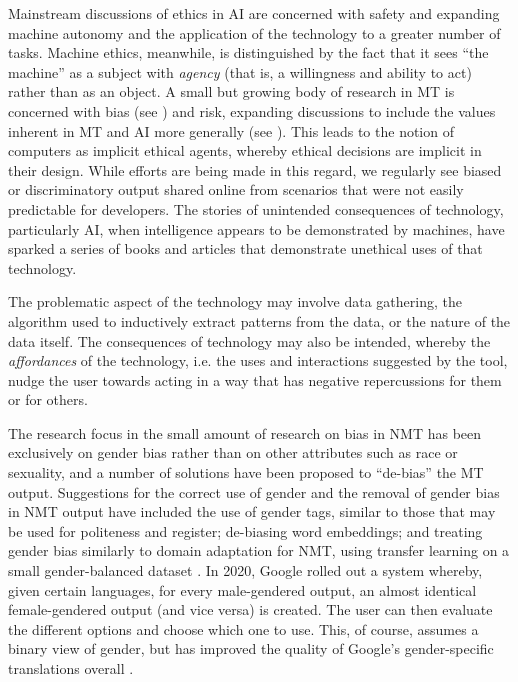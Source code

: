 \documentclass[output=paper]{langscibook}
\begin{document}
Mainstream discussions of ethics in AI are concerned with safety and expanding machine autonomy and the application of the technology to a greater number of tasks. Machine ethics, meanwhile, is distinguished by the fact that it sees “the machine” as a subject with \textit{agency} (that is, a willingness and ability to act) rather than as an object. A small but growing body of research in MT is concerned with bias (see ) and risk, expanding discussions to include the values inherent in MT and AI more generally (see ). This leads to the notion of computers as implicit ethical agents, whereby ethical decisions are implicit in their design. While efforts are being made in this regard, we regularly see biased or discriminatory output shared online from scenarios that were not easily predictable for developers. The stories of unintended consequences of technology, particularly AI, when intelligence appears to be demonstrated by machines, have sparked a series of books and articles that demonstrate unethical uses of that technology.

The problematic aspect of the technology may involve data gathering, the algorithm used to inductively extract patterns from the data, or the nature of the data itself. The consequences of technology may also be intended, whereby the \textit{affordances} of the technology, i.e. the uses and interactions suggested by the tool, nudge the user towards acting in a way that has negative repercussions for them or for others. 

The research focus in the small amount of research on bias in NMT has been exclusively on gender bias rather than on other attributes such as race or sexuality, and a number of solutions have been proposed to “de-bias” the MT output. Suggestions for the correct use of gender and the removal of gender bias in NMT output have included the use of gender tags, similar to those that may be used for politeness and register; de-biasing word embeddings; and treating gender bias similarly to domain adaptation for NMT, using transfer learning on a small gender-balanced dataset \citep{TomalinUllmann2021}. In 2020, Google rolled out a system whereby, given certain languages, for every male-gendered output, an almost identical female-gendered output (and vice versa) is created. The user can then evaluate the different options and choose which one to use. This, of course, assumes a binary view of gender, but has improved the quality of Google’s gender-specific translations overall \citep{Johnson2020}.
\end{document}

